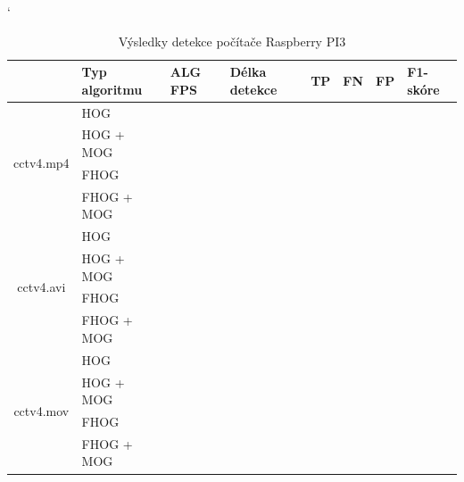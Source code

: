 \begin{table}[H]
\catcode`
\centering
\caption{Výsledky detekce počítače Raspberry PI3}
\label{resultTabRPI3}
\begin{tabular}{|c|l|l|l|l|l|l|l|}
\hline
                         & Typ algoritmu   & ALG FPS & Délka detekce & TP & FN & FP & F1-skóre \\ \hline
\multirow{4}{*}{cctv4.mp4} & HOG        &         &               &    &    &    &          \\ \cline{2-8} 
                         & HOG + MOG  &         &               &    &    &    &          \\ \cline{2-8} 
                         & FHOG       &         &               &    &    &    &          \\ \cline{2-8} 
                         & FHOG + MOG &         &               &    &    &    &          \\ \hline\hline 
\multirow{4}{*}{cctv4.avi} & HOG        &         &               &    &    &    &          \\ \cline{2-8} 
                         & HOG + MOG  &         &               &    &    &    &          \\ \cline{2-8} 
                         & FHOG       &         &               &    &    &    &          \\ \cline{2-8} 
                         & FHOG + MOG &         &               &    &    &    &          \\ \hline \hline
\multirow{4}{*}{cctv4.mov} & HOG        &         &               &    &    &    &          \\ \cline{2-8} 
                         & HOG + MOG  &         &               &    &    &    &          \\ \cline{2-8} 
                         & FHOG       &         &               &    &    &    &          \\ \cline{2-8} 
                         & FHOG + MOG &         &               &    &    &    &          \\ \hline
\end{tabular}
\end{table}


